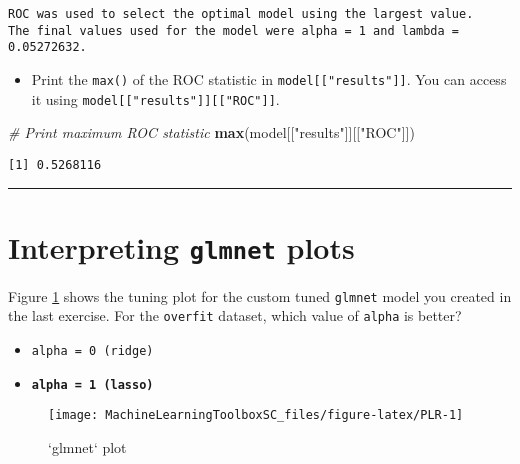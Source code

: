 \documentclass[]{book}
\newenvironment{Shaded}{\begin{snugshade}}{\end{snugshade}}
\newcommand{\KeywordTok}[1]{\textcolor[rgb]{0.13,0.29,0.53}{\textbf{#1}}}
\newcommand{\StringTok}[1]{\textcolor[rgb]{0.31,0.60,0.02}{#1}}
\newcommand{\CommentTok}[1]{\textcolor[rgb]{0.56,0.35,0.01}{\textit{#1}}}
\newcommand{\NormalTok}[1]{#1}
\providecommand{\tightlist}{%
  \setlength{\itemsep}{0pt}\setlength{\parskip}{0pt}}
\begin{document}
\begin{verbatim}
ROC was used to select the optimal model using the largest value.
The final values used for the model were alpha = 1 and lambda = 0.05272632.
\end{verbatim}

\begin{itemize}
\tightlist
\item
  Print the \texttt{max()} of the ROC statistic in
  \texttt{model{[}{[}"results"{]}{]}}. You can access it using
  \texttt{model{[}{[}"results"{]}{]}{[}{[}"ROC"{]}{]}}.
\end{itemize}

\begin{Shaded}
\begin{Highlighting}[]
\CommentTok{# Print maximum ROC statistic}
\KeywordTok{max}\NormalTok{(model[[}\StringTok{"results"}\NormalTok{]][[}\StringTok{"ROC"}\NormalTok{]])}
\end{Highlighting}
\end{Shaded}

\begin{verbatim}
[1] 0.5268116
\end{verbatim}

\begin{center}\rule{0.5\linewidth}{\linethickness}\end{center}

\section{\texorpdfstring{Interpreting \texttt{glmnet}
plots}{Interpreting glmnet plots}}\label{interpreting-glmnet-plots}

Figure \ref{fig:PLR} shows the tuning plot for the custom tuned
\texttt{glmnet} model you created in the last exercise. For the
\texttt{overfit} dataset, which value of \texttt{alpha} is better?

\begin{itemize}
\item
  \texttt{alpha\ =\ 0\ (ridge)}
\item
  \textbf{\texttt{alpha\ =\ 1\ (lasso)}}
\end{itemize}

\begin{figure}

{\centering \texttt{[image: MachineLearningToolboxSC\_files/figure-latex/PLR-1]} 

}

\caption{`glmnet` plot}\label{fig:PLR}
\end{figure}
\end{document}
